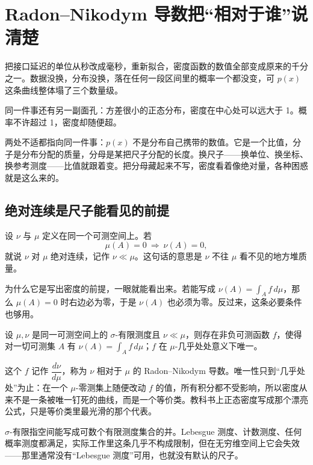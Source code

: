 \section{Radon--Nikodym 导数把``相对于谁''说清楚}
\label{sec:12-Real-Analysis-Support/05-Measure-Integration-and-Conditional-Expectation/04}

把接口延迟的单位从秒改成毫秒，重新拟合，密度函数的数值全部变成原来的千分之一。数据没换，分布没换，落在任何一段区间里的概率一个都没变，可 \(p(x)\) 这条曲线整体塌了三个数量级。

同一件事还有另一副面孔：方差很小的正态分布，密度在中心处可以远大于 1。概率不许超过 1，密度却随便超。

两处不适都指向同一件事：\(p(x)\) 不是分布自己携带的数值。它是一个比值，分子是分布分配的质量，分母是某把尺子分配的长度。换尺子——换单位、换坐标、换参考测度——比值就跟着变。把分母藏起来不写，密度看着像绝对量，各种困惑就是这么来的。

\subsection{绝对连续是尺子能看见的前提}

设 \(\nu\) 与 \(\mu\) 定义在同一个可测空间上。若
\[
\mu(A)=0\ \Longrightarrow\ \nu(A)=0,
\]
就说 \(\nu\) 对 \(\mu\) 绝对连续，记作 \(\nu\ll\mu\)。这句话的意思是 \(\nu\) 不往 \(\mu\) 看不见的地方堆质量。

为什么它是写出密度的前提，一眼就能看出来。若能写成 \(\nu(A)=\int_A f\,d\mu\)，那么 \(\mu(A)=0\) 时右边必为零，于是 \(\nu(A)\) 也必须为零。反过来，这条必要条件也够用。

\begin{theorem}
设 \(\mu,\nu\) 是同一可测空间上的 \(\sigma\)-有限测度且 \(\nu\ll\mu\)，则存在非负可测函数 \(f\)，使得对一切可测集 \(A\) 有 \(\nu(A)=\int_A f\,d\mu\)；\(f\) 在 \(\mu\)-几乎处处意义下唯一。
\end{theorem}

这个 \(f\) 记作 \(\dfrac{d\nu}{d\mu}\)，称为 \(\nu\) 相对于 \(\mu\) 的 Radon--Nikodym 导数。唯一性只到``几乎处处''为止：在一个 \(\mu\)-零测集上随便改动 \(f\) 的值，所有积分都不受影响，所以密度从来不是一条被唯一钉死的曲线，而是一个等价类。教科书上正态密度写成那个漂亮公式，只是等价类里最光滑的那个代表。

\(\sigma\)-有限指空间能写成可数个有限测度集合的并。Lebesgue 测度、计数测度、任何概率测度都满足，实际工作里这条几乎不构成限制，但在无穷维空间上它会失效——那里通常没有``Lebesgue 测度''可用，也就没有默认的尺子。

